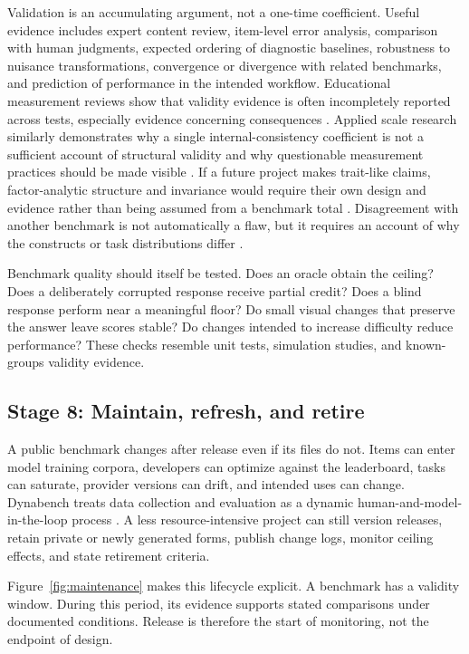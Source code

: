 \documentclass[12pt]{article}
\begin{document}
Validation is an accumulating argument, not a one-time coefficient. Useful evidence includes expert content review, item-level error analysis, comparison with human judgments, expected ordering of diagnostic baselines, robustness to nuisance transformations, convergence or divergence with related benchmarks, and prediction of performance in the intended workflow. Educational measurement reviews show that validity evidence is often incompletely reported across tests, especially evidence concerning consequences \citep{cizek2008,downing2003,cook2006,lane2014consequences}. Applied scale research similarly demonstrates why a single internal-consistency coefficient is not a sufficient account of structural validity and why questionable measurement practices should be made visible \citep{flake2017,flakefried2020,hussey2020}. If a future project makes trait-like claims, factor-analytic structure and invariance would require their own design and evidence rather than being assumed from a benchmark total \citep{fabrigar1999,reiser2000scale,putnick2016}. Disagreement with another benchmark is not automatically a flaw, but it requires an account of why the constructs or task distributions differ \citep{sun2023validity}.

Benchmark quality should itself be tested. Does an oracle obtain the ceiling? Does a deliberately corrupted response receive partial credit? Does a blind response perform near a meaningful floor? Do small visual changes that preserve the answer leave scores stable? Do changes intended to increase difficulty reduce performance? These checks resemble unit tests, simulation studies, and known-groups validity evidence.

\subsection{Stage 8: Maintain, refresh, and retire}

A public benchmark changes after release even if its files do not. Items can enter model training corpora, developers can optimize against the leaderboard, tasks can saturate, provider versions can drift, and intended uses can change. Dynabench treats data collection and evaluation as a dynamic human-and-model-in-the-loop process \citep{kiela2021dynabench}. A less resource-intensive project can still version releases, retain private or newly generated forms, publish change logs, monitor ceiling effects, and state retirement criteria.

Figure~\ref{fig:maintenance} makes this lifecycle explicit. A benchmark has a validity window. During this period, its evidence supports stated comparisons under documented conditions. Release is therefore the start of monitoring, not the endpoint of design.
\end{document}
